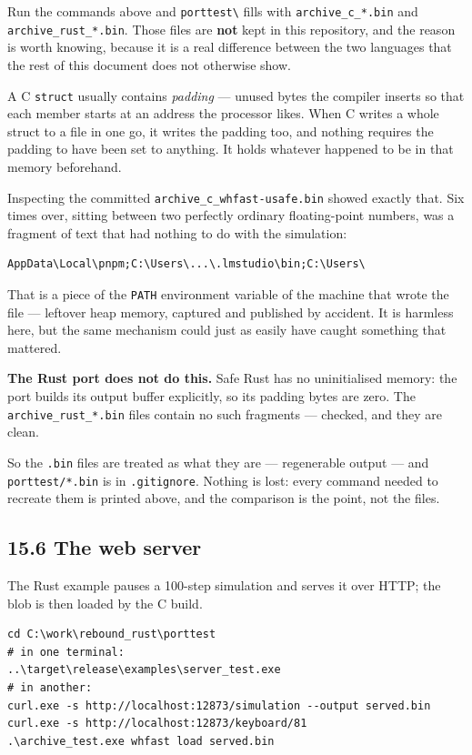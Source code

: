 \documentclass[11pt]{article}
\begin{document}
Run the commands above and \texttt{porttest\textbackslash{}} fills with \texttt{archive\_c\_*.bin} and \texttt{archive\_rust\_*.bin}. Those files are \textbf{not} kept in this repository, and the reason is worth knowing, because it is a real difference between the two languages that the rest of this document does not otherwise show.

A C \texttt{struct} usually contains \emph{padding} --- unused bytes the compiler inserts so that each member starts at an address the processor likes. When C writes a whole struct to a file in one go, it writes the padding too, and nothing requires the padding to have been set to anything. It holds whatever happened to be in that memory beforehand.

Inspecting the committed \texttt{archive\_c\_whfast-usafe.bin} showed exactly that. Six times over, sitting between two perfectly ordinary floating-point numbers, was a fragment of text that had nothing to do with the simulation:

\begin{lstlisting}
AppData\Local\pnpm;C:\Users\...\.lmstudio\bin;C:\Users\
\end{lstlisting}

That is a piece of the \texttt{PATH} environment variable of the machine that wrote the file --- leftover heap memory, captured and published by accident. It is harmless here, but the same mechanism could just as easily have caught something that mattered.

\textbf{The Rust port does not do this.} Safe Rust has no uninitialised memory: the port builds its output buffer explicitly, so its padding bytes are zero. The \texttt{archive\_rust\_*.bin} files contain no such fragments --- checked, and they are clean.

So the \texttt{.bin} files are treated as what they are --- regenerable output --- and \texttt{porttest/*.bin} is in \texttt{.gitignore}. Nothing is lost: every command needed to recreate them is printed above, and the comparison is the point, not the files.

\subsection{15.6 The web server}

The Rust example pauses a 100-step simulation and serves it over HTTP; the blob is then loaded by the C build.

\begin{lstlisting}
cd C:\work\rebound_rust\porttest
# in one terminal:
..\target\release\examples\server_test.exe
# in another:
curl.exe -s http://localhost:12873/simulation --output served.bin
curl.exe -s http://localhost:12873/keyboard/81
.\archive_test.exe whfast load served.bin
\end{lstlisting}
\end{document}
